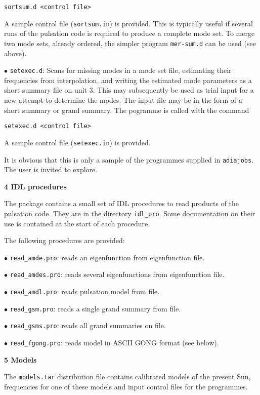 {\tt sortsum.d <control file>}

\item{}
A sample control file ({\tt sortsum.in}) is provided.
This is typically useful if several runs of the pulsation code
is required to produce a complete mode set.
To merge two mode sets, already ordered,
the simpler program {\tt mer-sum.d} can be used (see above).

\medskip
\item{$\bullet$}
{\tt setexec.d}:
Scans for missing modes in a mode set file,
estimating their frequencies from interpolation, and writing
the estimated mode parameters as a short summary file on unit 3.
This may subsequently be used as trial input for a new attempt to
determine the modes.
The input file may be in the form of a short summary or grand summary.
The pogramme is called with the command

{\tt setexec.d <control file>}

\item{}
A sample control file ({\tt setexec.in}) is provided.

\medskip
It is obvious that this is only a sample of the programmes
supplied in {\tt adiajobs}.
The user is invited to explore.

\mainsect
{\bf 4 IDL procedures}

The package contains a small set of IDL procedures
to read products of the pulsation code.
They are in the directory {\tt idl\_pro}.
Some documentation on their use is contained at the start of
each procedure.

The following procedures are provided:

\item{$\bullet$}
{\tt read\_amde.pro}: reads an eigenfunction from eigenfunction file.
\item{$\bullet$}
{\tt read\_amdes.pro}: reads several eigenfunctions from eigenfunction file.
\item{$\bullet$}
{\tt read\_amdl.pro}: reads pulsation model from file.
\item{$\bullet$}
{\tt read\_gsm.pro}: reads a single grand summary from file.
\item{$\bullet$}
{\tt read\_gsms.pro}: reads all grand summaries on file.
\item{$\bullet$}
{\tt read\_fgong.pro}: reads model in ASCII GONG format (see below).

\mainsect
{\bf 5 Models}

The {\tt models.tar} distribution file contains
calibrated models of the present Sun,
frequencies for one of these models and input control
files for the programmes.

